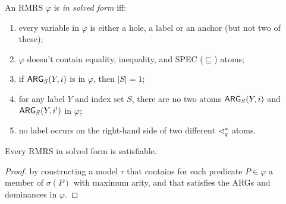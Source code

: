 \begin{definition}\label{defn:solved-forms}
  An RMRS $\varphi$ is \emph{in solved form} iff:
  \begin{enumerate}
  \item every variable in $\varphi$ is either a hole, a label or an
    anchor (but not two of 
    these);
  \item $\varphi$ doesn't contain equality, inequality, and SPEC
    ($\sqsubseteq$) atoms;
  \item if $\mathsf{ARG}_S(Y,i)$ is in $\varphi$, then $|S| = 1$;
  \item for any label $Y$ and index set $S$, there
    are no two atoms $\mathsf{ARG}_S(Y,i)$ and $\mathsf{ARG}_S(Y,i')$ in $\varphi$;
  \item no label occurs on the right-hand side of two
    different $\lhd^*_q$ atoms.
  \end{enumerate}
\end{definition}

\begin{claim}
  Every RMRS in solved form is satisfiable.
\end{claim}
\begin{proof}
by constructing a model $\tau$ that
contains for each predicate $P\in \varphi$ a member of $\sigma(P)$ with
maximum arity, and that satisfies the ARGs and dominances in $\varphi$.
\end{proof}

